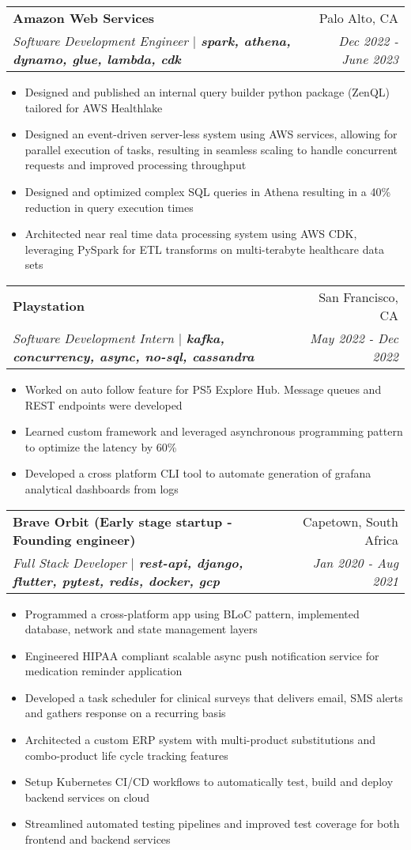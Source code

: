 \documentclass[a4paper,20pt]{article}
\makeatletter
\newcommand{\resumeItemClean}[1]{
    \item\small{
        {#1 \vspace{-2pt}}
    }
}
\newcommand{\resumeSubheading}[4]{
  \vspace{-1pt}\item
    \begin{tabular*}{0.97\textwidth}{l@{\extracolsep{\fill}}r}
      \textbf{#1} & #2 \\
      \textit{#3} & \textit{#4} \\
    \end{tabular*}\vspace{-5pt}
}
\newcommand{\resumeItemListStart}{\begin{itemize}}
\newcommand{\resumeItemListEnd}{\end{itemize}\vspace{-5pt}}
\makeatother
\begin{document}
  \resumeSubheading{Amazon Web Services}{Palo Alto, CA}
    {Software Development Engineer  \(|\) \textbf{spark, athena, dynamo, glue, lambda, cdk}}{Dec 2022 - June 2023}
    \resumeItemListStart
        \resumeItemClean
          {Designed and published an internal query builder python package (ZenQL) tailored for AWS Healthlake}
        \resumeItemClean
          {Designed an event-driven server-less system using AWS services, allowing for parallel execution of tasks, resulting in seamless scaling to handle concurrent requests and improved processing throughput}
        \resumeItemClean
        {Designed and optimized complex SQL queries in Athena resulting in a 40\% reduction in query execution times}
        \resumeItemClean
        {Architected near real time data processing system using AWS CDK, leveraging PySpark for ETL transforms on multi-terabyte healthcare data sets}
        \resumeItemListEnd
        
  \resumeSubheading{Playstation}{San Francisco, CA}
    {Software Development Intern  \(|\) \textbf{kafka, concurrency, async, no-sql, cassandra}}{May 2022 - Dec 2022}
    \resumeItemListStart
        \resumeItemClean
        {Worked on auto follow feature for PS5 Explore Hub. Message queues and REST endpoints were developed}
        \resumeItemClean
          {Learned custom framework and leveraged asynchronous programming pattern to optimize the latency by 60\%}
        \resumeItemClean
          {Developed a cross platform CLI tool to automate generation of grafana analytical dashboards from logs}
        \resumeItemListEnd
        
    \resumeSubheading{Brave Orbit (Early stage startup - Founding engineer)}{Capetown, South Africa}
    {Full Stack Developer \(|\) \textbf{rest-api, django, flutter, pytest, redis, docker, gcp}}{Jan 2020 - Aug 2021}
    \resumeItemListStart
        \resumeItemClean
            {Programmed a cross-platform app using BLoC pattern, implemented database, network and state management layers}
          \resumeItemClean
            {Engineered HIPAA compliant scalable async push notification service for medication reminder application}
          \resumeItemClean
            {Developed a task scheduler for clinical surveys that delivers email, SMS alerts and gathers response on a recurring basis}
          \resumeItemClean
            {Architected a custom ERP system with multi-product substitutions and combo-product life cycle tracking features}
          \resumeItemClean
            {Setup Kubernetes CI/CD workflows to automatically test, build and deploy backend services on cloud}
          \resumeItemClean
            {Streamlined automated testing pipelines and improved test coverage for both frontend and backend services}
    \resumeItemListEnd
      
\end{document}
